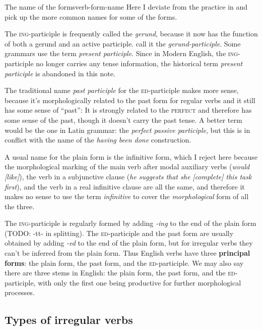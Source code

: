 \documentclass[UTF8, a4paper, oneside, scheme=plain, 12pt]{ctexbook}
\newcommand*{\citechap}[1]{Ch.~{#1}}
\newcommand*{\concept}[1]{\textbf{#1}}
\newcommand*{\term}[1]{\emph{#1}}
\newcommand{\form}[1]{\emph{#1}}
\newcommand{\category}[1]{\textsc{#1}}
\newcommand{\formcat}[1]{\textsc{#1}}
\begin{document}
\begin{infobox}{The name of the forms}{verb-form-name}
    Here I deviate from the practice in \citep[\citechap{3}]{cgel} 
    and pick up the more common names for some of the forms. 

    The \formcat{ing}-participle is frequently called the \term{gerund},
    because it now has the function of both a gerund and an active participle.
    \citet{cgel} call it the \term{gerund-participle}.
    Some grammars use the term \term{present participle}.
    Since in Modern English,
    the \formcat{ing}-participle no longer carries any tense information,
    the historical term \term{present participle} is abandoned in this note.

    The traditional name \term{past participle} for the \formcat{ed}-participle makes more sense,
    because it's morphologically related to the past form for regular verbs 
    and it still has some sense of ``past'':
    It is strongly related to the \category{perfect} and therefore has some sense of the past,
    though it doesn't carry the past tense.
    A better term would be the one in Latin grammar: the \term{perfect passive participle},
    but this is in conflict with the name of the \form{having been done} construction.

    A usual name for the plain form is the infinitive form,
    which I reject here because the morphological marking of 
    the main verb after modal auxiliary verbs  
    (\form{would [like]}),
    the verb in a subjunctive clause 
    (\form{he suggests that she [complete] this task first}),
    and the verb in a real infinitive clause are all the same,
    and therefore it makes no sense to use the term \term{infinitive} 
    to cover the \emph{morphological} form of all the three.
\end{infobox}

The \formcat{ing}-participle is regularly formed by adding \form{-ing} to the end of the plain form
(TODO: -tt- in splitting).
The \formcat{ed}-participle and the past form are usually obtained 
by adding \form{-ed} to the end of the plain form,
but for irregular verbs they can't be inferred from the plain form.
Thus English verbs have three \concept{principal forms}:
the plain form, the past form, and the \formcat{ed}-participle.
We may also say there are three stems in English:
the plain form, the past form, and the \formcat{ed}-participle,
with only the first one being productive for further morphological processes.

\subsection{Types of irregular verbs}
\end{document}
